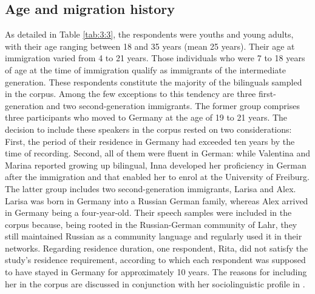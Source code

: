 \subsection{Age and migration history}
As detailed in Table \ref{tab:3:3}, the respondents were youths and young adults, with their age ranging between 18 and 35 years (mean 25 years). Their age at immigration varied from 4 to 21 years. Those individuals who were 7 to 18 years of age at the time of immigration qualify as immigrants of the intermediate generation. These respondents constitute the majority of the bilinguals sampled in the corpus. Among the few exceptions to this tendency are three first-generation and two second-generation immigrants. The former group comprises three participants who moved to Germany at the age of 19 to 21 years. The decision to include these speakers in the corpus rested on two considerations: First, the period of their residence in Germany had exceeded ten years by the time of recording. Second, all of them were fluent in German: while Valentina and Marina reported growing up bilingual, Inna developed her proficiency in German after the immigration and that enabled her to enrol at the University of Freiburg. The latter group includes two second-generation immigrants, Larisa and Alex. Larisa was born in Germany into a Russian German family, whereas Alex arrived in Germany being a four-year-old. Their speech samples were included in the corpus because, being rooted in the Russian-German community of Lahr, they still maintained Russian as a community language and regularly used it in their networks. Regarding residence duration, one respondent, Rita, did not satisfy the study's residence requirement, according to which each respondent was supposed to have stayed in Germany for approximately 10 years. The reasons for including her in the corpus are discussed in conjunction with her sociolinguistic profile in .




